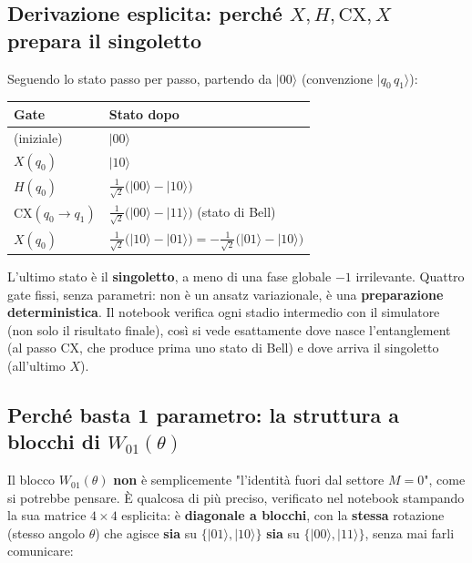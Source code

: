 \documentclass[11pt,a4paper]{article}
\begin{document}
\subsection*{Derivazione esplicita: perché $X,H,\mathrm{CX},X$ prepara il singoletto}

Seguendo lo stato passo per passo, partendo da $|00\rangle$ (convenzione
$|q_0\,q_1\rangle$):

\begin{center}
\renewcommand{\arraystretch}{1.25}
\begin{tabular}{@{}ll@{}}
\toprule
\rowcolor{inkblue!10}
\textbf{Gate} & \textbf{Stato dopo}\\
\midrule
(iniziale) & $|00\rangle$\\
$X(q_0)$ & $|10\rangle$\\
$H(q_0)$ & $\frac{1}{\sqrt2}\big(|00\rangle-|10\rangle\big)$\\
$\mathrm{CX}(q_0\to q_1)$ & $\frac{1}{\sqrt2}\big(|00\rangle-|11\rangle\big)$ (stato di Bell)\\
$X(q_0)$ & $\frac{1}{\sqrt2}\big(|10\rangle-|01\rangle\big)=-\frac{1}{\sqrt2}\big(|01\rangle-|10\rangle\big)$\\
\bottomrule
\end{tabular}
\end{center}

L'ultimo stato è il \textbf{singoletto}, a meno di una fase globale $-1$
irrilevante. Quattro gate fissi, senza parametri: non è un ansatz
variazionale, è una \textbf{preparazione deterministica}. Il notebook
verifica ogni stadio intermedio con il simulatore (non solo il risultato
finale), così si vede esattamente dove nasce l'entanglement (al passo
CX, che produce prima uno stato di Bell) e dove arriva il singoletto
(all'ultimo $X$).

\subsection*{Perché basta 1 parametro: la struttura a blocchi di $W_{01}(\theta)$}

Il blocco $W_{01}(\theta)$ \textbf{non} è semplicemente "l'identità
fuori dal settore $M=0$", come si potrebbe pensare. È qualcosa di più
preciso, verificato nel notebook stampando la sua matrice $4\times4$
esplicita: è \textbf{diagonale a blocchi}, con la \textbf{stessa}
rotazione (stesso angolo $\theta$) che agisce \textbf{sia} su
$\{|01\rangle,|10\rangle\}$ \textbf{sia} su $\{|00\rangle,|11\rangle\}$,
senza mai farli comunicare:
\end{document}
